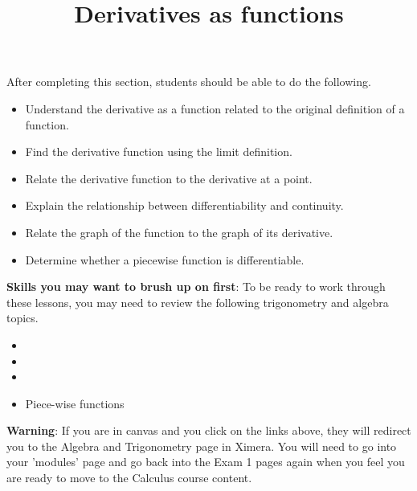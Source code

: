 \documentclass{ximera}
\title{Derivatives as functions}
\begin{document}
\begin{abstract}
\end{abstract}

\maketitle

\begin{sectionOutcomes}

After completing this section, students should be able to do the following.

\begin{itemize}
\item Understand the derivative as a function related to the original
  definition of a function.
\item Find the derivative function using the limit definition.
\item Relate the derivative function to the derivative at a point.
\item Explain the relationship between differentiability and continuity.
\item Relate the graph of the function to the graph of its derivative.
\item Determine whether a piecewise function is differentiable.
\end{itemize}

\end{sectionOutcomes}
\bigskip

\textbf{Skills you may want to brush up on first}: To be ready to work
through these lessons, you may need to review the following trigonometry and algebra topics.
\begin{itemize}
    \item {}
    \item {}
    \item {}
    \item Piece-wise functions
\end{itemize}

\bigskip

\textbf{Warning}: If you are in canvas and you click on the links above, they will redirect you
to the Algebra and Trigonometry page in Ximera. You will need to
go into your 'modules' page and go back into the Exam 1 pages again
when you feel you are ready to move to the Calculus course content.
\end{document}
